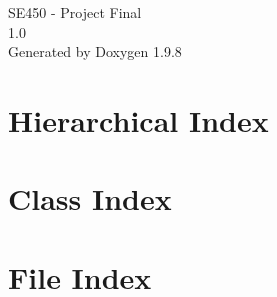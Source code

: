 \documentclass[twoside]{book}
\newcommand{\+}{\discretionary{\mbox{\scriptsize$\hookleftarrow$}}{}{}}
\newcommand{\clearemptydoublepage}{%
    \newpage{\pagestyle{empty}\cleardoublepage}%
  }
\begin{document}
  \raggedbottom
    \hypersetup{pageanchor=false,
                bookmarksnumbered=true,
                pdfencoding=unicode
               }
  \begin{titlepage}
  \vspace*{7cm}
  \begin{center}%
  {\Large SE450 -\/ Project Final}\\
  [1ex]\large 1.\+0 \\
  \vspace*{1cm}
  {\large Generated by Doxygen 1.9.8}\\
  \end{center}
  \end{titlepage}
  \clearemptydoublepage
  \tableofcontents
  \clearemptydoublepage
  \hypersetup{pageanchor=true}
\chapter{Hierarchical Index}

\chapter{Class Index}

\chapter{File Index}

\end{document}
